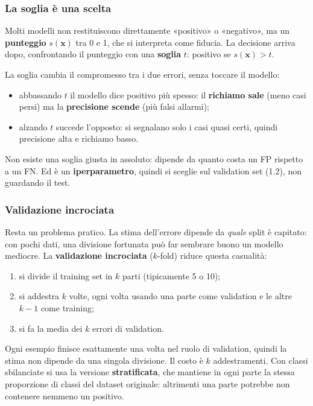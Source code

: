 \documentclass[12pt]{extarticle}
\begin{document}
\subsubsection{La soglia è una scelta}

\noindent Molti modelli non restituiscono direttamente «positivo» o «negativo», ma un \textbf{punteggio} $s(\mathbf{x})$ tra 0 e 1, che si interpreta come fiducia. La decisione arriva dopo, confrontando il punteggio con una \textbf{soglia} $t$: positivo se $s(\mathbf{x}) > t$.

\noindent La soglia cambia il compromesso tra i due errori, senza toccare il modello:
\begin{itemize}
    \item abbassando $t$ il modello dice positivo più spesso: il \textbf{richiamo sale} (meno casi persi) ma la \textbf{precisione scende} (più falsi allarmi);
    \item alzando $t$ succede l'opposto: si segnalano solo i casi quasi certi, quindi precisione alta e richiamo basso.
\end{itemize}
Non esiste una soglia giusta in assoluto: dipende da quanto costa un FP rispetto a un FN. Ed è un \textbf{iperparametro}, quindi si sceglie sul validation set (1.2), non guardando il test.

\subsubsection{Validazione incrociata}

\noindent Resta un problema pratico. La stima dell'errore dipende da \emph{quale} split è capitato: con pochi dati, una divisione fortunata può far sembrare buono un modello mediocre. La \textbf{validazione incrociata} ($k$-fold) riduce questa casualità:
\begin{enumerate}
    \item si divide il training set in $k$ parti (tipicamente 5 o 10);
    \item si addestra $k$ volte, ogni volta usando una parte come validation e le altre $k-1$ come training;
    \item si fa la media dei $k$ errori di validation.
\end{enumerate}
Ogni esempio finisce esattamente una volta nel ruolo di validation, quindi la stima non dipende da una singola divisione. Il costo è $k$ addestramenti. Con classi sbilanciate si usa la versione \textbf{stratificata}, che mantiene in ogni parte la stessa proporzione di classi del dataset originale: altrimenti una parte potrebbe non contenere nemmeno un positivo.
\end{document}
